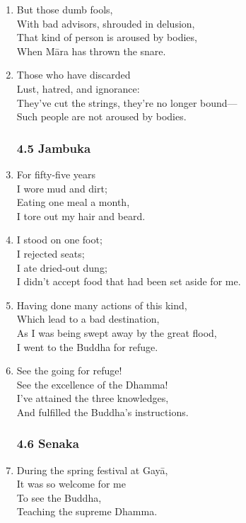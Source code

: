 \documentclass[10pt, openany]{book}
\begin{document}
\begin{enumerate}
\item But those dumb fools,\\
With bad advisors, shrouded in delusion,\\
That kind of person is aroused by bodies,\\
When Māra has thrown the snare.

\item Those who have discarded\\
Lust, hatred, and ignorance:\\
They’ve cut the strings, they’re no longer bound—\\
Such people are not aroused by bodies.

\subsubsection*{4.5 Jambuka}

\item For fifty-five years\\
I wore mud and dirt;\\
Eating one meal a month,\\
I tore out my hair and beard.

\item I stood on one foot;\\
I rejected seats;\\
I ate dried-out dung;\\
I didn’t accept food that had been set aside for me.

\item Having done many actions of this kind,\\
Which lead to a bad destination,\\
As I was being swept away by the great flood,\\
I went to the Buddha for refuge.

\item See the going for refuge!\\
See the excellence of the Dhamma!\\
I’ve attained the three knowledges,\\
And fulfilled the Buddha’s instructions.

\subsubsection*{4.6 Senaka}

\item During the spring festival at Gayā,\\
It was so welcome for me\\
To see the Buddha,\\
Teaching the supreme Dhamma.


\end{enumerate}
\end{document}
